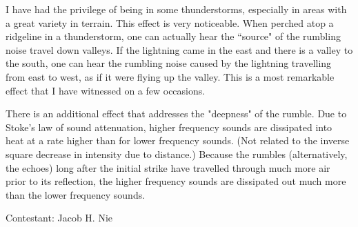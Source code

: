 \documentclass[12pt]{article}
\begin{document}
\begin{remark} I have had the privilege of being in some thunderstorms, especially in areas with a great variety in terrain.  This effect is very noticeable.  When perched atop a ridgeline in a thunderstorm, one can actually hear the ``source" of the rumbling noise travel down valleys.  If the lightning came in the east and there is a valley to the south, one can hear the rumbling noise caused by the lightning travelling from east to west, as if it were flying up the valley.  This is a most remarkable effect that I have witnessed on a few occasions. \end{remark}

There is an additional effect that addresses the "deepness" of the rumble.  Due to Stoke's law of sound attenuation, higher frequency sounds are dissipated into heat at a rate higher than for lower frequency sounds.  (Not related to the inverse square decrease in intensity due to distance.)  Because the rumbles (alternatively, the echoes) long after the initial strike have travelled through much more air prior to its reflection, the higher frequency sounds are dissipated out much more than the lower frequency sounds.  

\vspace{1cm}


\hfill Contestant: Jacob H. Nie
\end{document}
